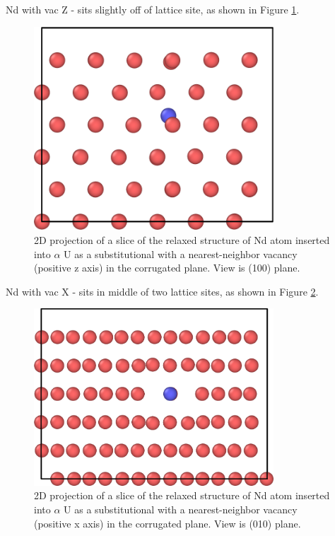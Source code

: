 \documentclass[review]{elsarticle}
\begin{document}
Nd with vac Z -  sits slightly off of lattice site, as shown in Figure \ref{fig:ndvacz}.

\begin{figure}[ht]
	\centering
	\includegraphics[width=0.8\textwidth]{ndvacz.png}
    \caption{2D projection of a slice of the relaxed structure of Nd atom inserted into $\alpha$ U as a substitutional with a nearest-neighbor vacancy (positive z axis) in the corrugated plane.  View is (100) plane.}\label{fig:ndvacz}
\end{figure}  

Nd with vac X - sits in middle of two lattice sites, as shown in Figure \ref{fig:ndvacx}.

\begin{figure}[ht]
	\centering
	\includegraphics[width=0.8\textwidth]{ndvacx.png}
    \caption{2D projection of a slice of the relaxed structure of Nd atom inserted into $\alpha$ U as a substitutional with a nearest-neighbor vacancy (positive x axis) in the corrugated plane.  View is (010) plane.}\label{fig:ndvacx}
\end{figure}  
\end{document}
